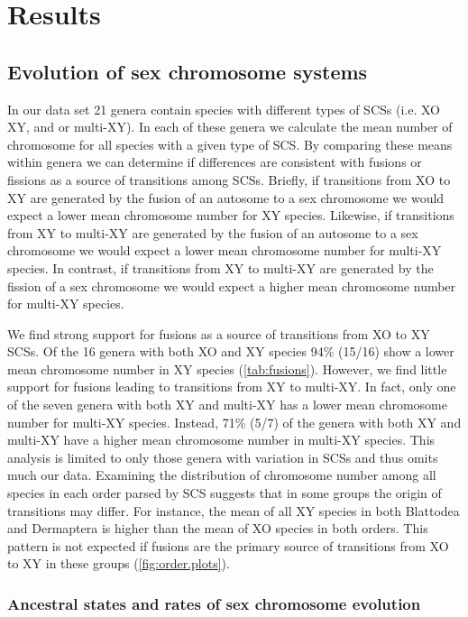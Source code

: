 \section{Results}

\subsection{Evolution of sex chromosome systems}
In our data set 21 genera contain species with different types of SCSs (i.e. XO XY, and or multi-XY).
In each of these genera we calculate the mean number of chromosome for all species with a given type of SCS.
By comparing these means within genera we can determine if differences are consistent with fusions or fissions as a source of transitions among SCSs.
Briefly, if transitions from XO to XY are generated by the fusion of an autosome to a sex chromosome we would expect a lower mean chromosome number for XY species.
Likewise, if transitions from XY to multi-XY are generated by the fusion of an autosome to a sex chromosome we would expect a lower mean chromosome number for multi-XY species.
In contrast, if transitions from XY to multi-XY are generated by the fission of a sex chromosome we would expect a higher mean chromosome number for multi-XY species.

We find strong support for fusions as a source of transitions from XO to XY SCSs.
Of the 16 genera with both XO and XY species 94\% (15/16) show a lower mean chromosome number in XY species (\cref{tab:fusions}). 
However, we find little support for fusions leading to transitions from XY to multi-XY.
In fact, only one of the seven genera with both XY and multi-XY has a lower mean chromosome number for multi-XY species.
Instead, 71\% (5/7) of the genera with both XY and multi-XY have a higher mean chromosome number in multi-XY species.
This analysis is limited to only those genera with variation in SCSs and thus omits much our data.
Examining the distribution of chromosome number among all species in each order parsed by SCS suggests that in some groups the origin of transitions may differ.
For instance, the mean of all XY species in both Blattodea and Dermaptera is higher than the mean of XO species in both orders.
This pattern is not expected if fusions are the primary source of transitions from XO to XY in these groups (\cref{fig:order.plots}).

\subsubsection{Ancestral states and rates of sex chromosome evolution}

